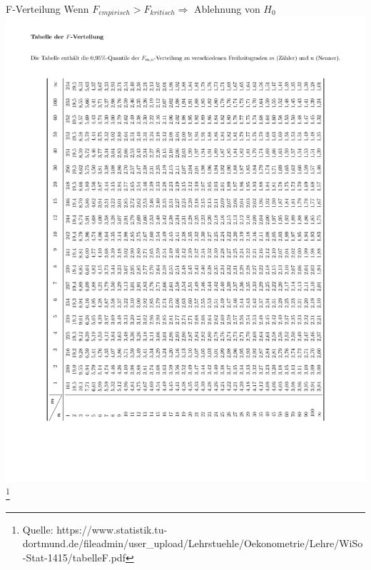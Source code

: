 \documentclass{beamer}
\begin{document}
	\begin{frame}{F-Verteilung}
		Wenn $F_{empirisch} > F_{kritisch} \Rightarrow $ Ablehnung von $H_0$
		\includegraphics[trim=60 100 240 190,clip,angle=270,origin=c, width=\textwidth]{Bilder/F-verteilung}
		\let\thefootnote\relax\footnote{{\fontsize{5}{5} \selectfont \vspace{-5ex}
				Quelle: https://www.statistik.tu-dortmund.de/fileadmin/user\_upload/Lehrstuehle/Oekonometrie/Lehre/WiSo-Stat-1415/tabelleF.pdf}}
	\end{frame}
	
\end{document}
